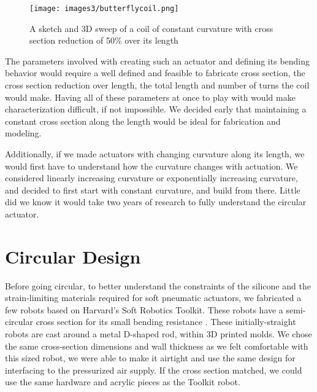 \begin{figure}[ht]
    \centering
    \texttt{[image: images3/butterflycoil.png]}
    \caption{A sketch and 3D sweep of a coil of constant curvature with cross section reduction of 50\% over its length}
    \label{fig:butterflycoil}
\end{figure}

The parameters involved with creating such an actuator and defining its bending behavior would require a well defined and feasible to fabricate cross section, the cross section reduction over length, the total length and number of turns the coil would make. Having all of these parameters at once to play with would make characterization difficult, if not impossible. We decided early that maintaining a constant cross section along the length would be ideal for fabrication and modeling. 

Additionally, if we made actuators with changing curvature along its length, we would first have to understand how the curvature changes with actuation. We considered linearly increasing curvature or exponentially increasing curvature, and decided to first start with constant curvature, and build from there. Little did we know it would take two years of research to fully understand the circular actuator. 

\section{Circular Design}

Before going circular, to better understand the constraints of the silicone and the strain-limiting materials required for soft pneumatic actuators, we fabricated a few robots based on Harvard's Soft Robotics Toolkit. These robots have a semi-circular cross section for its small bending resistance \cite{polygerinos_modeling_2015}. These initially-straight robots are cast around a metal D-shaped rod, within 3D printed molds. We chose the same cross-section dimensions and wall thickness as we felt comfortable with this sized robot, we were able to make it airtight and use the same design for interfacing to the pressurized air supply. If the cross section matched, we could use the same hardware and acrylic pieces as the Toolkit robot. 